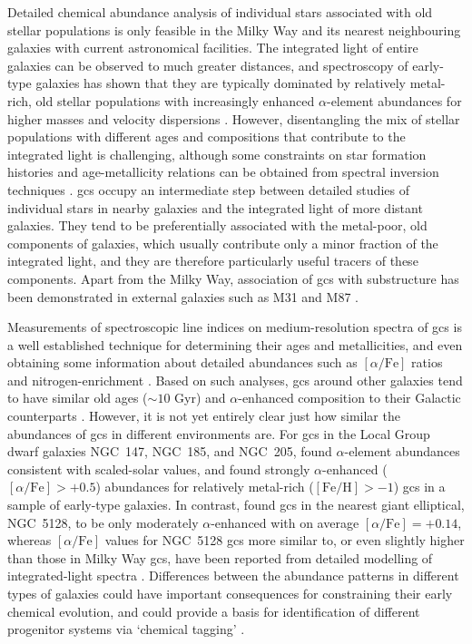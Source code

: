 \documentclass{aa}
\begin{document}
Detailed chemical abundance analysis of individual stars associated with old stellar populations is only feasible in the Milky Way and its nearest neighbouring galaxies with current astronomical facilities. The integrated light of entire galaxies can be observed to much greater distances, and spectroscopy of early-type galaxies has shown that they are typically dominated by relatively metal-rich, old stellar populations with increasingly enhanced $\alpha$-element abundances for higher masses and velocity dispersions \citep{Worthey1992,Kuntschner2000,Trager2000,Thomas2005,Conroy2014,Kriek2019,Parikh2019}.
However, disentangling the mix of stellar populations with different ages and compositions that contribute to the integrated light is challenging, although some constraints on star formation histories and age-metallicity relations can be obtained from spectral inversion techniques \citep{Peterken2020,Greener2021}.
\acp{gc} occupy an intermediate step between detailed studies of individual stars in nearby galaxies and the integrated light of more distant galaxies. They tend to be preferentially associated with the metal-poor, old  components of galaxies, which usually contribute only a minor fraction of the integrated light, and they are therefore particularly useful tracers of these components. Apart from the Milky Way, association of \acp{gc} with substructure has been demonstrated in external galaxies such as M31 \citep{Mackey2019a} and M87 \citep{Romanowsky2012}.

Measurements of spectroscopic line indices on medium-resolution spectra of \acp{gc} is a well established technique for determining their ages and metallicities, and even obtaining some information about detailed abundances such as $[\alpha/\mathrm{Fe}]$ ratios and nitrogen-enrichment \citep{Brodie2006,Schiavon2013}. Based on such analyses, \acp{gc} around other galaxies tend to have similar old ages ($\sim10$ Gyr) and $\alpha$-enhanced composition to their Galactic counterparts \citep{Larsen2002e,Beasley2008,Puzia2005,Strader2005,Cenarro2007}. However, it is not yet entirely clear just how similar the abundances of \acp{gc} in different environments are. 
For \acp{gc} in the Local Group dwarf galaxies NGC~147, NGC~185, and NGC~205, \citet{Sharina2006} found $\alpha$-element abundances consistent with scaled-solar values, and \citet{Puzia2006} found strongly $\alpha$-enhanced ($[\alpha/\mathrm{Fe}] > +0.5$) abundances for relatively metal-rich ($\mathrm{[Fe/H]} > -1$) \acp{gc} in a sample of early-type galaxies.
In contrast, \citet{Woodley2010} found \acp{gc} in the nearest giant elliptical, NGC~5128, to be only moderately $\alpha$-enhanced with on average $[\alpha/\mathrm{Fe}] = +0.14$, whereas $[\alpha/\mathrm{Fe}]$ values for NGC~5128 \acp{gc} more similar to, or even slightly higher than those in Milky Way \acp{gc}, have been reported from detailed modelling of integrated-light spectra \citep{Colucci2013,Hernandez2018}.  Differences between the abundance patterns in different types of galaxies could have important consequences for constraining their early chemical evolution, and could provide a basis for identification of different progenitor systems via `chemical tagging' \citep{Freeman2002,Sakari2014,Sakari2015,Horta2020,Minelli2021}.
\end{document}
